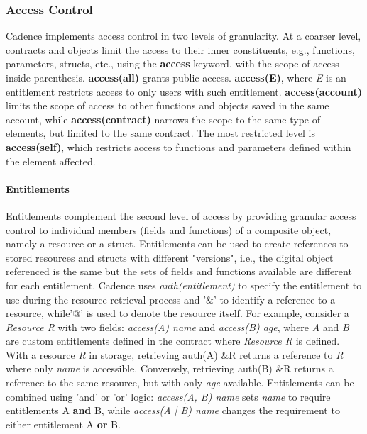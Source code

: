 \documentclass[../NFTComp_IEEE.tex]{subfiles}
\begin{document}
\subsubsection{Access Control}
Cadence implements access control in two levels of granularity. At a coarser level, contracts and objects limit the access to their inner constituents, e.g., functions, parameters, structs, etc., using the \textbf{access} keyword, with the scope of access inside parenthesis. \textbf{access(all)} grants public access. \textbf{access(E)}, where \textit{E} is an entitlement restricts access to only users with such entitlement. \textbf{access(account)} limits the scope of access to other functions and objects saved in the same account, while \textbf{access(contract)} narrows the scope to the same type of elements, but limited to the same contract. The most restricted level is \textbf{access(self)}, which restricts access to functions and parameters defined within the element affected.

\paragraph{Entitlements}
Entitlements complement the second level of access by providing granular access control to individual members (fields and functions) of a composite object, namely a resource or a struct. Entitlements can be used to create references to stored resources and structs with different "versions", i.e., the digital object referenced is the same but the sets of fields and functions available are different for each entitlement. Cadence uses \textit{auth(entitlement)} to specify the entitlement to use during the resource retrieval process and '\&' to identify a reference to a resource, while'@' is used to denote the resource itself. For example, consider a \textit{Resource R} with two fields: \textit{access(A) name} and \textit{access(B) age}, where \textit{A} and \textit{B} are custom entitlements defined in the contract where \textit{Resource R} is defined. With a resource \textit{R} in storage, retrieving auth(A) \&R returns a reference to \textit{R} where only \textit{name} is accessible. Conversely, retrieving auth(B) \&R returns a reference to the same resource, but with only \textit{age} available. Entitlements can be combined using 'and' or 'or' logic: \textit{access(A, B) name} sets \textit{name} to require entitlements A \textbf{and} B, while \textit{access(A | B) name} changes the requirement to either entitlement A \textbf{or} B.
\end{document}
